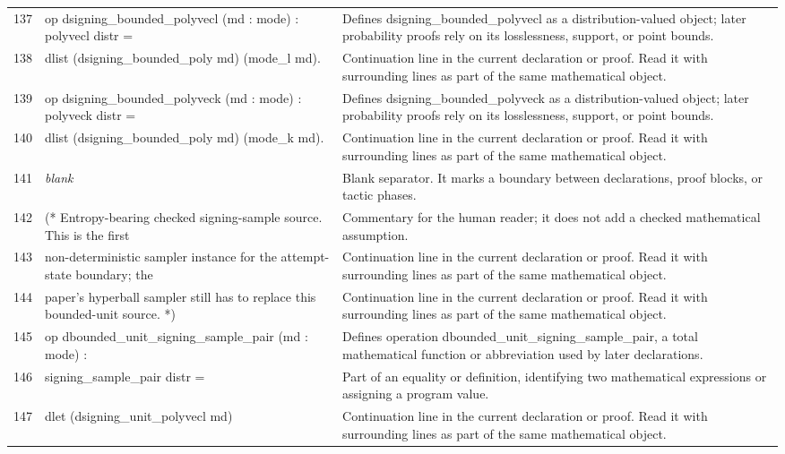 \documentclass[10pt]{article}
\begin{document}
\begin{longtable}{r L{0.53\textwidth} L{0.37\textwidth}}
137 & {\ttfamily\scriptsize op dsigning\_bounded\_polyvecl (md : mode) : polyvecl distr =} & Defines dsigning\_bounded\_polyvecl as a distribution-valued object; later probability proofs rely on its losslessness, support, or point bounds. \\
138 & {\ttfamily\scriptsize   dlist (dsigning\_bounded\_poly md) (mode\_l md).} & Continuation line in the current declaration or proof.  Read it with surrounding lines as part of the same mathematical object. \\
139 & {\ttfamily\scriptsize op dsigning\_bounded\_polyveck (md : mode) : polyveck distr =} & Defines dsigning\_bounded\_polyveck as a distribution-valued object; later probability proofs rely on its losslessness, support, or point bounds. \\
140 & {\ttfamily\scriptsize   dlist (dsigning\_bounded\_poly md) (mode\_k md).} & Continuation line in the current declaration or proof.  Read it with surrounding lines as part of the same mathematical object. \\
141 & {\ttfamily\scriptsize \emph{blank}} & Blank separator.  It marks a boundary between declarations, proof blocks, or tactic phases. \\
142 & {\ttfamily\scriptsize (* Entropy-bearing checked signing-sample source. This is the first} & Commentary for the human reader; it does not add a checked mathematical assumption. \\
143 & {\ttfamily\scriptsize    non-deterministic sampler instance for the attempt-state boundary; the} & Continuation line in the current declaration or proof.  Read it with surrounding lines as part of the same mathematical object. \\
144 & {\ttfamily\scriptsize    paper's hyperball sampler still has to replace this bounded-unit source. *)} & Continuation line in the current declaration or proof.  Read it with surrounding lines as part of the same mathematical object. \\
145 & {\ttfamily\scriptsize op dbounded\_unit\_signing\_sample\_pair (md : mode) :} & Defines operation dbounded\_unit\_signing\_sample\_pair, a total mathematical function or abbreviation used by later declarations. \\
146 & {\ttfamily\scriptsize    signing\_sample\_pair distr =} & Part of an equality or definition, identifying two mathematical expressions or assigning a program value. \\
147 & {\ttfamily\scriptsize   dlet (dsigning\_unit\_polyvecl md)} & Continuation line in the current declaration or proof.  Read it with surrounding lines as part of the same mathematical object. \\

\end{longtable}
\end{document}
